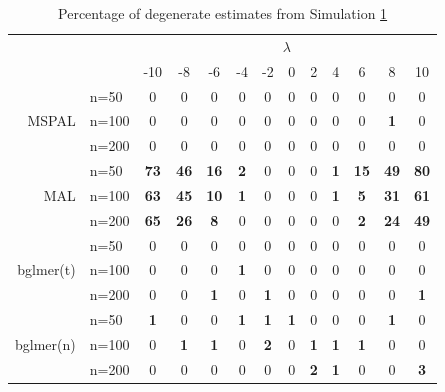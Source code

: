\documentclass[11pt, a4paper]{article}
\newcommand*{\bb}{\boldsymbol}
\theoremstyle{example} \newtheorem{example}{Example}[section]
\theoremstyle{theorem} \newtheorem{theorem}{Theorem}[section]
\theoremstyle{theorem }\newtheorem{proposition}{Proposition}[section]
\theoremstyle{theorem }\newtheorem{corollary}{Corollary}[section]
\def\\bbeta{\bb{\\bbeta}}
\begin{document}
\begin{table}[ht]
	\centering
	\caption{Percentage of degenerate estimates from Simulation \hyperref[sec:sim1]{1}} 
	\label{tab:sim1}
	\begin{tabular}{rlccccccccccc}
	\toprule
	&& \multicolumn{11}{c}{$\lambda$} \\
	\cmidrule{3-13} 
	 &  & -10 & -8 & -6 & -4 & -2 & 0 & 2 & 4 & 6 & 8 & 10 \\ 
	\cmidrule{3-13} 
 & n=50 & 0 & 0 & 0 & 0 & 0 & 0 & 0 & 0 & 0 & 0 & 0 \\ 
MSPAL & n=100 & 0 & 0 & 0 & 0 & 0 & 0 & 0 & 0 & 0 & \textbf{1} & 0 \\ 
& n=200 & 0 & 0 & 0 & 0 & 0 & 0 & 0 & 0 & 0 & 0 & 0 \\ \cmidrule{3-13} 
& n=50 & \textbf{73} & \textbf{46} & \textbf{16} & \textbf{2} & 0 & 0 & 0 & \textbf{1} & \textbf{15} & \textbf{49} & \textbf{80} \\ 
MAL & n=100 & \textbf{63} & \textbf{45} & \textbf{10} & \textbf{1} & 0 & 0 & 0 & \textbf{1} & \textbf{5} & \textbf{31} & \textbf{61} \\ 
& n=200 & \textbf{65} & \textbf{26} & \textbf{8} & 0 & 0 & 0 & 0 & 0 & \textbf{2} & \textbf{24} & \textbf{49} \\ \cmidrule{3-13} 
& n=50 & 0 & 0 & 0 & 0 & 0 & 0 & 0 & 0 & 0 & 0 & 0 \\ 
bglmer(t) & n=100 & 0 & 0 & 0 & \textbf{1} & 0 & 0 & 0 & 0 & 0 & 0 & 0 \\ 
& n=200 & 0 & 0 & \textbf{1} & 0 & \textbf{1} & 0 & 0 & 0 & 0 & 0 & \textbf{1} \\ \cmidrule{3-13} 
& n=50 & \textbf{1} & 0 & 0 & \textbf{1} & \textbf{1} & \textbf{1} & 0 & 0 & 0 & \textbf{1} & 0 \\ 
bglmer(n) & n=100 & 0 & \textbf{1} & \textbf{1} & 0 & \textbf{2} & 0 & \textbf{1} & \textbf{1} & \textbf{1} & 0 & 0 \\ 
& n=200 & 0 & 0 & 0 & 0 & 0 & 0 & \textbf{2} & \textbf{1} & 0 & 0 & \textbf{3} \\ 
	\bottomrule
	\end{tabular}
\end{table}
\end{document}
